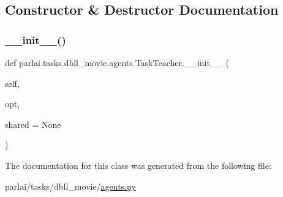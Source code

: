 \subsection{Constructor \& Destructor Documentation}
\mbox{\label{classparlai_1_1tasks_1_1dbll__movie_1_1agents_1_1TaskTeacher_a2eed62654cfdb4fc25372c15bbb810b3}} 
\subsubsection{\texorpdfstring{\+\_\+\+\_\+init\+\_\+\+\_\+()}{\_\_init\_\_()}}
{\footnotesize\ttfamily def parlai.\+tasks.\+dbll\+\_\+movie.\+agents.\+Task\+Teacher.\+\_\+\+\_\+init\+\_\+\+\_\+ (\begin{DoxyParamCaption}\item[{}]{self,  }\item[{}]{opt,  }\item[{}]{shared = {\ttfamily None} }\end{DoxyParamCaption})}



The documentation for this class was generated from the following file\+:\begin{DoxyCompactItemize}
\item 
parlai/tasks/dbll\+\_\+movie/\hyperlink{parlai_2tasks_2dbll__movie_2agents_8py}{agents.\+py}\end{DoxyCompactItemize}
